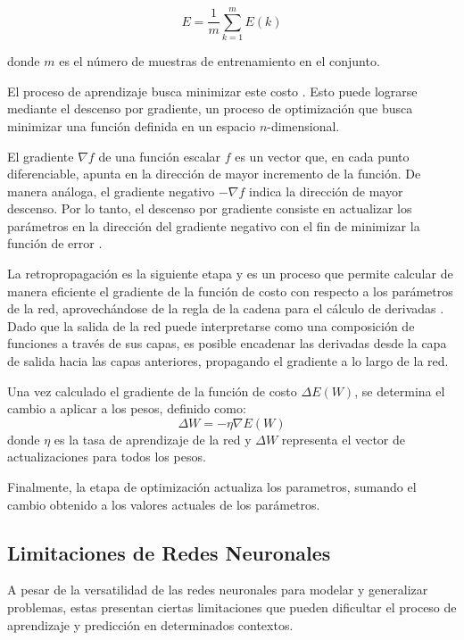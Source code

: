\begin{equation}
    E = \frac{1}{m}\sum_{k=1}^{m}E(k)
    \label{eq:costo}
\end{equation}

donde $m$ es el número de muestras de entrenamiento en el conjunto.
\medskip

El proceso de aprendizaje busca minimizar este costo \parencite[pp.~61--62]{da2016artificial}. 
Esto puede lograrse mediante el descenso por gradiente, un proceso de optimización que busca 
minimizar una función definida en un espacio $n$-dimensional.
\medskip

El gradiente $\nabla f$ de una función escalar $f$ es un vector que, en cada punto
diferenciable, apunta en la dirección de mayor incremento de la función.
De manera análoga, el gradiente negativo $-\nabla f$ indica la dirección de mayor
descenso. Por lo tanto, el descenso por gradiente consiste en actualizar los parámetros
en la dirección del gradiente negativo con el fin de minimizar la función de error \parencite[p.~61--62]{Kriesel2007NeuralNetworks}.
\medskip

La retropropagación es la siguiente etapa y es un proceso que permite calcular de manera eficiente el
gradiente de la función de costo con respecto a los parámetros de la red,
aprovechándose de la regla de la cadena para el cálculo de derivadas \parencite[p.62]{da2016artificial}. Dado que
la salida de la red puede interpretarse como una composición de funciones a través
de sus capas, es posible encadenar las derivadas desde la capa de salida hacia las
capas anteriores, propagando el gradiente a lo largo de la red.
\medskip

Una vez calculado el gradiente de la función de costo $\Delta E(W)$, se determina el cambio a aplicar a los pesos,
definido como:
\begin{equation}
    \Delta W = -\eta \nabla E(W)
    \label{eq:cambio_pesos}
\end{equation}
donde $\eta$ es la tasa de aprendizaje de la red y $\Delta W$ representa el vector
de actualizaciones para todos los pesos.
\medskip

Finalmente, la etapa de optimización actualiza los parametros, sumando el
cambio obtenido a los valores actuales de los parámetros.

\subsection{Limitaciones de Redes Neuronales}
A pesar de la versatilidad de las redes neuronales para modelar y generalizar problemas,
estas presentan ciertas limitaciones que pueden dificultar el proceso de aprendizaje y
predicción en determinados contextos.
\medskip

